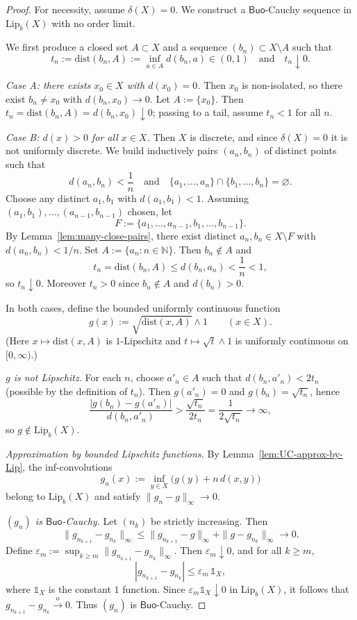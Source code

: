 \documentclass[10pt,a4paper]{amsart}
\newcommand{\Buo}{\ensuremath{\mathsf{Buo}}}
\newcommand{\N}{\mathbb{N}}
\renewcommand{\ge}{\geqslant}
\renewcommand{\le}{\leqslant}
\begin{document}
\begin{proof}
\noindent For necessity, assume $\delta(X)=0$. We construct a \Buo-Cauchy sequence in
$\mathrm{Lip}_b(X)$ with no order limit.

\smallskip\noindent
We first produce a closed set $A\subset X$ and a sequence $(b_n)\subset X\setminus A$ such that
\[
t_n:=\mathrm{dist}(b_n,A):=\inf_{a\in A}d(b_n,a)\in(0,1)\quad\text{and}\quad t_n\downarrow0.
\]

\smallskip
\emph{Case A: there exists $x_0\in X$ with $d(x_0)=0$.}
Then $x_0$ is non-isolated, so there exist $b_n\neq x_0$ with $d(b_n,x_0)\to0$.
Let $A:=\{x_0\}$. Then $t_n=\mathrm{dist}(b_n,A)=d(b_n,x_0)\downarrow0$; passing to a tail, assume $t_n<1$ for all $n$.

\smallskip
\emph{Case B: $d(x)>0$ for all $x\in X$.}
Then $X$ is discrete, and since $\delta(X)=0$ it is not uniformly discrete.
We build inductively pairs $(a_n,b_n)$ of distinct points such that
\[
d(a_n,b_n)<\frac1n
\quad\text{and}\quad
\{a_1,\dots,a_n\}\cap\{b_1,\dots,b_n\}=\varnothing.
\]
Choose any distinct $a_1,b_1$ with $d(a_1,b_1)<1$.
Assuming $(a_1,b_1),\dots,(a_{n-1},b_{n-1})$ chosen, let
\[
F:=\{a_1,\dots,a_{n-1},b_1,\dots,b_{n-1}\}.
\]
By Lemma~\ref{lem:many-close-pairs}, there exist distinct $a_n,b_n\in X\setminus F$ with $d(a_n,b_n)<1/n$.
Set $A:=\{a_n:n\in\N\}$. Then $b_n\notin A$ and
\[
t_n=\mathrm{dist}(b_n,A)\le d(b_n,a_n)<\frac1n<1,
\]
so $t_n\downarrow0$. Moreover $t_n>0$ since $b_n\notin A$ and $d(b_n)>0$.

\smallskip\noindent
In both cases, define the bounded uniformly continuous function
\[
g(x):=\sqrt{\mathrm{dist}(x,A)}\wedge 1\qquad(x\in X).
\]
(Here $x\mapsto \mathrm{dist}(x,A)$ is $1$-Lipschitz and $t\mapsto \sqrt{t}\wedge 1$
is uniformly continuous on $[0,\infty)$.)

\smallskip\noindent
\emph{$g$ is not Lipschitz.}
For each $n$, choose $a'_n\in A$ such that $d(b_n,a'_n)<2t_n$ (possible by the definition of $t_n$).
Then $g(a'_n)=0$ and $g(b_n)=\sqrt{t_n}$, hence
\[
\frac{|g(b_n)-g(a'_n)|}{d(b_n,a'_n)}
>\frac{\sqrt{t_n}}{2t_n}
=\frac{1}{2\sqrt{t_n}}
\longrightarrow\infty,
\]
so $g\notin\mathrm{Lip}_b(X)$.

\smallskip\noindent
\emph{Approximation by bounded Lipschitz functions.}
By Lemma~\ref{lem:UC-approx-by-Lip}, the inf-convolutions
\[
g_n(x):=\inf_{y\in X}\bigl(g(y)+n\,d(x,y)\bigr)
\]
belong to $\mathrm{Lip}_b(X)$ and satisfy $\|g_n-g\|_\infty\to0$.

\smallskip\noindent
\emph{$(g_n)$ is \Buo-Cauchy.}
Let $(n_k)$ be strictly increasing. Then
\[
\|g_{n_{k+1}}-g_{n_k}\|_\infty
\le \|g_{n_{k+1}}-g\|_\infty+\|g-g_{n_k}\|_\infty
\longrightarrow0.
\]
Define $\varepsilon_m:=\sup_{k\ge m}\|g_{n_{k+1}}-g_{n_k}\|_\infty$. Then $\varepsilon_m\downarrow0$, and for all $k\ge m$,
\[
|g_{n_{k+1}}-g_{n_k}|\le \varepsilon_m\,\mathds1_X,
\]
where $\mathds1_X$ is the constant $1$ function. Since $\varepsilon_m\mathds1_X\downarrow0$ in $\mathrm{Lip}_b(X)$,
it follows that $g_{n_{k+1}}-g_{n_k}\xrightarrow{\mathrm{o}}0$.
Thus $(g_n)$ is \Buo-Cauchy.


\end{proof}
\end{document}
